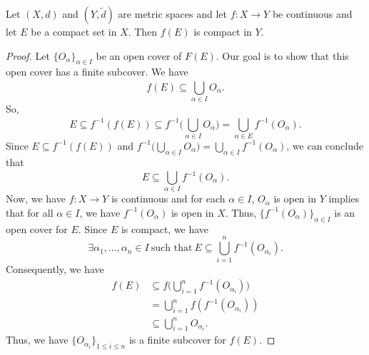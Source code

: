 \documentclass[a4paper]{article}
\begin{document}
\begin{theorem}[ ]
    Let \( (X,d) \) and \( (Y, \tilde{d}) \) are metric spaces and let \( f: X \to Y  \) be continuous and let \( E  \) be a compact set in \( X  \). Then \( f(E) \) is compact in \( Y  \). 
\end{theorem}
\begin{proof}
    Let \( \{ {O}_{\alpha} \}_{\alpha \in I} \) be an open cover of \( F(E) \). Our goal is to show that this open cover has a finite subcover. We have
    \[  f(E) \subseteq \bigcup_{ \alpha \in I  }^{  }  {O}_{\alpha}. \]
    So, 
    \[  E \subseteq f^{-1}(f(E)) \subseteq f^{-1} \Big(  \bigcup_{ \alpha \in I  }^{  } {O}_{\alpha} \Big) = \bigcup_{ \alpha \in E  }^{  }  f^{-1}({O}_{\alpha}). \]
    Since \( E \subseteq  f^{-1}(f(E)) \) and \( f^{-1} \Big(  \bigcup_{ \alpha \in I  }^{  }  {O}_{\alpha} \Big) = \bigcup_{ \alpha \in I  }^{  }  f^{-1}({O}_{\alpha}) \), we can conclude that 
    \[  E \subseteq  \bigcup_{ \alpha \in I  }^{  }  f^{-1}({O}_{\alpha}). \]
    Now, we have \( f: X \to Y  \) is continuous and for each \( \alpha \in I  \), \( {O}_{\alpha} \) is open in \( Y  \) implies that for all \(  \alpha \in I  \), we have \( f^{-1}({O}_{\alpha}) \) is open in \( X  \). Thus, \( \{ f^{-1}({O}_{\alpha}) \}_{\alpha \in I} \) is an open cover for \( E \). Since \( E  \) is compact, we have   
    \[  \exists {\alpha}_{1}, \dots, {\alpha}_{n} \in I \ \text{such that} \ E \subseteq \bigcup_{ i=1  }^{ n }  f^{-1}({O}_{{\alpha}_{i}}).   \]
    Consequently, we have 
    \begin{align*}
        f(E) &\subseteq  f \Big(  \bigcup_{ i=1  }^{ n }  f^{-1}({O}_{{\alpha}_{i}}) \Big) \\
            &= \bigcup_{ i=1  }^{ n }  f(f^{-1}({O}_{{\alpha}_{i}})) \\
            &\subseteq \bigcup_{ i=1  }^{ n }  {O}_{{\alpha}_{i}}.
\end{align*}
Thus, we have \( \{ {O}_{{\alpha}_{i}} \}_{1 \leq i \leq n} \) is a finite subcover for \( f(E) \).
\end{proof}
\end{document}

